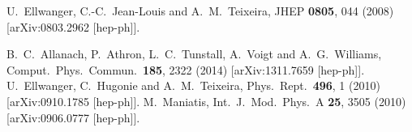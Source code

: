 \documentclass[final,3p,11pt,pdflatex]{elsarticle}
\begin{document}
\begin{thebibliography}{100}
  U.~Ellwanger, C.-C.~Jean-Louis and A.~M.~Teixeira,
  JHEP {\bf 0805}, 044 (2008)
  [arXiv:0803.2962 [hep-ph]].




  B.~C.~Allanach, P.~Athron, L.~C.~Tunstall, A.~Voigt and A.~G.~Williams,
  Comput.\ Phys.\ Commun.\  {\bf 185}, 2322 (2014)
  [arXiv:1311.7659 [hep-ph]].
  U.~Ellwanger, C.~Hugonie and A.~M.~Teixeira,
  Phys.\ Rept.\  {\bf 496}, 1 (2010)
  [arXiv:0910.1785 [hep-ph]].
  M.~Maniatis,
  Int.\ J.\ Mod.\ Phys.\ A {\bf 25}, 3505 (2010)
  [arXiv:0906.0777 [hep-ph]].



\end{thebibliography}
\end{document}
